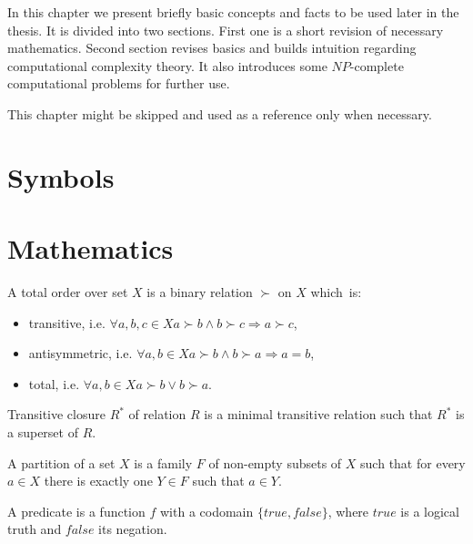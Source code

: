 In this chapter we present briefly basic concepts and facts to be used later in the thesis.
It is divided into two sections.
First one is a short revision of necessary mathematics.
Second section revises basics and builds intuition regarding computational complexity theory.
It also introduces some $NP$-complete computational problems for further use.

This chapter might be skipped and used as a reference only when necessary.

\section{Symbols}


\section{Mathematics}

\begin{defn}
A total order over set $X$ is a binary relation $\succ$ on $X$ which~is:
\begin{itemize}
	\item transitive, i.e. $\forall a,b,c \in X a \succ b \land b \succ c \Rightarrow a \succ c$,
	\item antisymmetric, i.e. $\forall a,b \in X a \succ b \land b \succ a \Rightarrow a=b $,
	\item total, i.e. $\forall a,b \in X a \succ b \lor b \succ a$.
\end{itemize}
\end{defn}

\begin{defn}
Transitive closure $R^*$ of relation $R$ is a minimal transitive relation 
such that $R^*$ is a superset of $R$.
\end{defn}

\begin{defn}
A partition of a set $X$ is a family $F$ of non-empty subsets of $X$
such that for every $a \in X$ there is exactly one $Y \in F$ such that $a \in Y$.
\end{defn}

\begin{defn}[predicate]
A predicate is a function $f$ with a codomain $\{true, false\}$,
where $true$ is a logical truth and $false$ its negation.
\end{defn}

